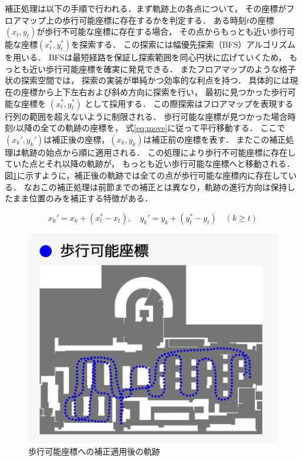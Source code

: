 補正処理は以下の手順で行われる．まず軌跡上の各点について，
その座標がフロアマップ上の歩行可能座標に存在するかを判定する．
ある時刻$t$の座標$(x_t, y_t)$が歩行不可能な座標に存在する場合，
その点からもっとも近い歩行可能な座標$(x_t^*, y_t^*)$を探索する．
この探索には幅優先探索（BFS）アルゴリズムを用いる．
BFSは最短経路を保証し探索範囲を同心円状に広げていくため，
もっとも近い歩行可能座標を確実に発見できる．
またフロアマップのような格子状の探索空間では，
探索の実装が単純かつ効率的な利点を持つ．
具体的には現在の座標から上下左右および斜め方向に探索を行い，
最初に見つかった歩行可能な座標を $(x_t^*, y_t^*)$ として採用する．
この際探索はフロアマップを表現する行列の範囲を超えないように制限される．
歩行可能な座標が見つかった場合時刻$t$以降の全ての軌跡の座標を，
式\eqref{eq:move}に従って平行移動する．
ここで$(x_k', y_k')$は補正後の座標，$(x_k, y_k)$は補正前の座標を表す．
またこの補正処理は軌跡の始点から順に適用される．%
この処理により歩行不可能座標に存在していた点とそれ以降の軌跡が，
もっとも近い歩行可能な座標へと移動される．
図\ref{fig:walkable-points}に示すように，補正後の軌跡では全ての点が歩行可能な座標内に存在している．
なおこの補正処理は前節までの補正とは異なり，軌跡の進行方向は保持したまま位置のみを補正する特徴がある．


\begin{equation}
  \label{eq:move}
x_k' = x_k + (x_t^* - x_t), \quad y_k' = y_k + (y_t^* - y_t) \quad (k \geq t)
\end{equation}


\begin{figure}[H]
    \centering
    \includegraphics[width=\linewidth]{../image/walkable-points.jpg}
    \caption{歩行可能座標への補正適用後の軌跡}    \label{fig:walkable-points}
\end{figure}
